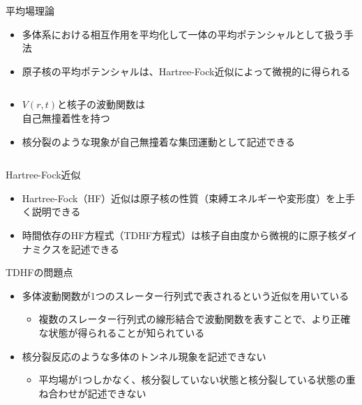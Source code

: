 \documentclass[14pt,aspectratio=169,xcolor=dvipsnames,table,dvipdfmx]{beamer}
\theoremstyle{definition}
\begin{document}
\begin{frame}{平均場理論}
  \begin{itemize}
    \item 多体系における相互作用を平均化して一体の平均ポテンシャルとして扱う手法
    \item 原子核の平均ポテンシャルは、Hartree-Fock近似によって微視的に得られる
  \end{itemize}
  \begin{columns}[t]
    \begin{column}{.5\textwidth}
      \begin{itemize}
        \item $V(r,t)$と核子の波動関数は\\自己無撞着性を持つ
        \item 核分裂のような現象が自己無撞着な集団運動として記述できる
      \end{itemize}
    \end{column}
    \begin{column}{.5\textwidth}
    \end{column}
  \end{columns}
\end{frame}
\begin{frame}{Hartree-Fock近似}
  \begin{itemize}
    \item Hartree-Fock（HF）近似は原子核の性質（束縛エネルギーや変形度）を上手く説明できる
    \item 時間依存のHF方程式（TDHF方程式）は核子自由度から微視的に原子核ダイナミクスを記述できる
  \end{itemize}
  \begin{block}{TDHFの問題点}
    \begin{itemize}
      \item 多体波動関数が1つのスレーター行列式で表されるという近似を用いている
            \begin{itemize}
              \item 複数のスレーター行列式の線形結合で波動関数を表すことで、より正確な状態が得られることが知られている
            \end{itemize}
      \item 核分裂反応のような多体のトンネル現象を記述できない
            \begin{itemize}
              \item 平均場が1つしかなく、核分裂していない状態と核分裂している状態の重ね合わせが記述できない
            \end{itemize}
    \end{itemize}
  \end{block}
\end{frame}
\end{document}
